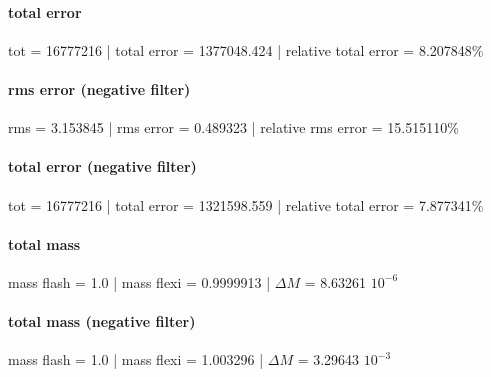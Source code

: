 \paragraph{total error}
tot = 16777216 | total error = 1377048.424 | relative total error = 8.207848\%

\paragraph{rms error (negative filter)}
rms = 3.153845 | rms error = 0.489323 | relative rms error = 15.515110\%

\paragraph{total error (negative filter)}
tot = 16777216 | total error = 1321598.559 | relative total error = 7.877341\%

\paragraph{total mass}
mass flash = 1.0 | mass flexi = 0.9999913 | $\Delta M$ = 8.63261 $10^{-6}$

\paragraph{total mass (negative filter)}
mass flash = 1.0 | mass flexi = 1.003296 | $\Delta M$ = 3.29643 $10^{-3}$
